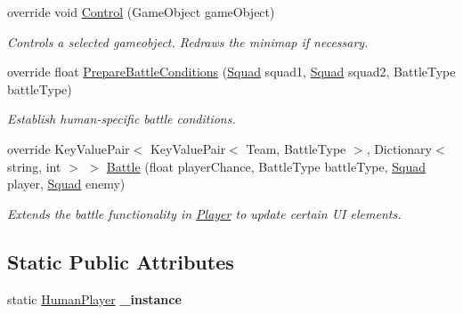 \begin{DoxyCompactItemize}
override void \hyperlink{class_human_player_a329d94217d51375a5656e4b0c5ec7969}{Control} (Game\+Object game\+Object)
\begin{DoxyCompactList}\small\item\em Controls a selected gameobject. Redraws the minimap if necessary. \end{DoxyCompactList}\item 
override float \hyperlink{class_human_player_a716048001a62fd94bcae01adf0cf39f8}{Prepare\+Battle\+Conditions} (\hyperlink{class_squad}{Squad} squad1, \hyperlink{class_squad}{Squad} squad2, Battle\+Type battle\+Type)
\begin{DoxyCompactList}\small\item\em Establish human-\/specific battle conditions. \end{DoxyCompactList}\item 
override Key\+Value\+Pair$<$ Key\+Value\+Pair$<$ Team, Battle\+Type $>$, Dictionary$<$ string, int $>$ $>$ \hyperlink{class_human_player_acec8f5e48d38f90059506d8551c63238}{Battle} (float player\+Chance, Battle\+Type battle\+Type, \hyperlink{class_squad}{Squad} player, \hyperlink{class_squad}{Squad} enemy)
\begin{DoxyCompactList}\small\item\em Extends the battle functionality in \hyperlink{class_player}{Player} to update certain U\+I elements. \end{DoxyCompactList}\end{DoxyCompactItemize}
\subsection*{Static Public Attributes}
\begin{DoxyCompactItemize}
\item 
\hypertarget{class_human_player_a023e8731a9065db704f48c0aa7921aaa}{}static \hyperlink{class_human_player}{Human\+Player} {\bfseries \+\_\+instance}\label{class_human_player_a023e8731a9065db704f48c0aa7921aaa}

\end{DoxyCompactItemize}
